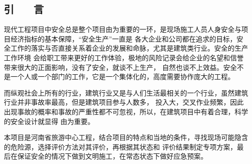 \begin{center}
    \section*{  \textbf{引 ~~ 言}}
\end{center}

\thispagestyle{plain}

\vskip0.5cm
现代工程项目中安全总是整个项目由为重要的一环，是现场施工人员人身安全与项目经济指标的基本保障，“安全生产”一直是
各大企业和公司都在追求的目标，安全工作的落实与否直接关系着企业的发展和命脉，尤其是建筑类行业。安全的生产工作环境
会给职工带来更好的工作体验，极地的风险记录会给企业的名望和信誉带来很大的正面影响，没有了安全，就谈不上生产，
自然也谈不上效益。安全不是一个人或一个部门的工作，它是一个集体化的，高度需要协作庞大的工程。

而纵观社会上所有的行业，建筑行业又是与人们生活最相关的一个行业，虽然建筑行业并非事故率最高，但是建筑项目参与人数多，
投入大，交叉作业频繁，因此出现事故的概率和事故的严重性都不可忽视，所以，在建筑项目中有着合理，科学的安全设计就显得
由为重要。

本项目是河南省旅游中心工程，结合项目的特点和当地的条件，寻找现场可能隐含的危险源，选择评价方法对其评价，再根据其状态和
评价结果制定专项方案，最后在保证安全的情况下做到文明施工，在常态状态下做好应急预案。

